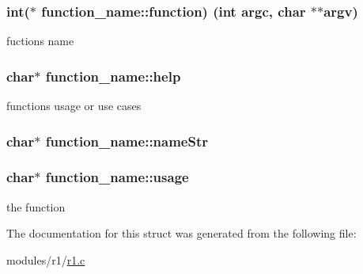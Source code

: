 \subsubsection[{\texorpdfstring{function}{function}}]{\setlength{\rightskip}{0pt plus 5cm}int($\ast$ function\+\_\+name\+::function) (int argc, char $\ast$$\ast$argv)}\hypertarget{structfunction__name_ad80214b3eea6c438c13ff5461c5350ab}{}\label{structfunction__name_ad80214b3eea6c438c13ff5461c5350ab}


fuction\textquotesingle{}s name 

\subsubsection[{\texorpdfstring{help}{help}}]{\setlength{\rightskip}{0pt plus 5cm}char$\ast$ function\+\_\+name\+::help}\hypertarget{structfunction__name_ac0f73e570d7d03a9f378a70e6d4d5632}{}\label{structfunction__name_ac0f73e570d7d03a9f378a70e6d4d5632}


function\textquotesingle{}s usage or use cases 

\subsubsection[{\texorpdfstring{name\+Str}{nameStr}}]{\setlength{\rightskip}{0pt plus 5cm}char$\ast$ function\+\_\+name\+::name\+Str}\hypertarget{structfunction__name_a7a94f7f31542a15b63160b6b213e0bcb}{}\label{structfunction__name_a7a94f7f31542a15b63160b6b213e0bcb}
\subsubsection[{\texorpdfstring{usage}{usage}}]{\setlength{\rightskip}{0pt plus 5cm}char$\ast$ function\+\_\+name\+::usage}\hypertarget{structfunction__name_a30f593e52febda0cc9d9703b9015fb0f}{}\label{structfunction__name_a30f593e52febda0cc9d9703b9015fb0f}


the function 



The documentation for this struct was generated from the following file\+:\begin{DoxyCompactItemize}
\item 
modules/r1/\hyperlink{r1_8c}{r1.\+c}\end{DoxyCompactItemize}
